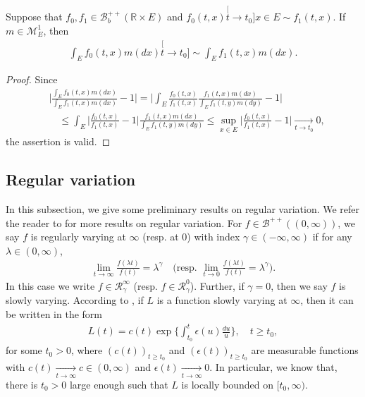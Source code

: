 \begin{lem} \label{lem: asymptotic equivalent of integration}
	Suppose that $f_0,f_1\in \mathscr B^{++}_b({\mathbb R \times E})$ and $f_0(t,x)\stackrel[t\to t_0]{x\in E}{\sim}f_1(t,x)$.
	If $m \in \mathcal M^1_E$, then
\begin{align}
	\int_E f_0(t,x)m(dx)
	\stackrel[t\to t_0]{}{\sim}
	\int_E f_1(t,x)m(dx).
\end{align}
\end{lem}
\begin{proof}
	Since
\begin{align}
	&\Big| \frac{	\int_E f_0(t,x)m(dx) }{ 	\int_E f_1(t,x)m(dx)  } - 1 \Big|
	= \Big| \int_E \frac{f_0(t,x)}{f_1(t,x)} \frac{f_1(t,x)m(dx)}{	\int_E f_1(t,y)m(dy)  } - 1\Big|
	\\&\quad \leq \int_E \Big|  \frac{f_0(t,x)}{f_1(t,x)} - 1 \Big| \frac{f_1(t,x)m(dx)}{	\int_E f_1(t,y)m(dy)  }
	\leq \sup_{x\in E} \Big|  \frac{f_0(t,x)}{f_1(t,x)} - 1 \Big|
	\xrightarrow[t\to t_0]{} 0,
\end{align}
	the assertion is valid.
\end{proof}

\subsection{Regular variation}
\label{sec: Regularly variation}
	In this subsection, we give some preliminary results on regular variation.
	We refer the reader to \cite{BinghamGoldieTeugels1989Regular} for more results on  regular variation.
	For $f\in \mathscr B^{++}((0,\infty))$, we say $f$ is regularly varying at $\infty$ (resp. at $0$) with index $\gamma \in (-\infty,\infty)$ if for any $\lambda \in (0,\infty)$,
\begin{align}
	\lim_{t\to\infty}\frac{f(\lambda t)}{f(t)}
	= \lambda^\gamma
	\quad \Big(\text{resp. } \lim_{t\to 0}\frac{f(\lambda t)}{f(t)}
	= \lambda^\gamma\Big).
\end{align}
	In this case we write  $f\in \mathcal R^\infty_\gamma$ (resp. $f\in \mathcal R^0_\gamma$).
	Further, if $\gamma = 0$, then we say $f$ is slowly varying.
	According to \cite[Theorem 1.3.1]{BinghamGoldieTeugels1989Regular},
	if $L$ is a function slowly varying at $\infty$, then it can be written in the form
\begin{align}
	L(t)
	= c(t) \exp\Big\{\int_{t_0}^t \epsilon(u) \frac{du}{u}\Big\},\quad t\geq t_0,
\end{align}
	for some $t_0>0$, where $(c(t))_{t\geq t_0}$ and $(\epsilon(t))_{t\geq t_0}$ are measurable functions with $c(t) \xrightarrow[t\to \infty]{} c \in (0,\infty)$ and $\epsilon(t) \xrightarrow[t\to \infty]{} 0$.
	In particular, we know that, there is $t_0 > 0$ large enough such that $L$ is locally bounded on $[t_0,\infty)$.

